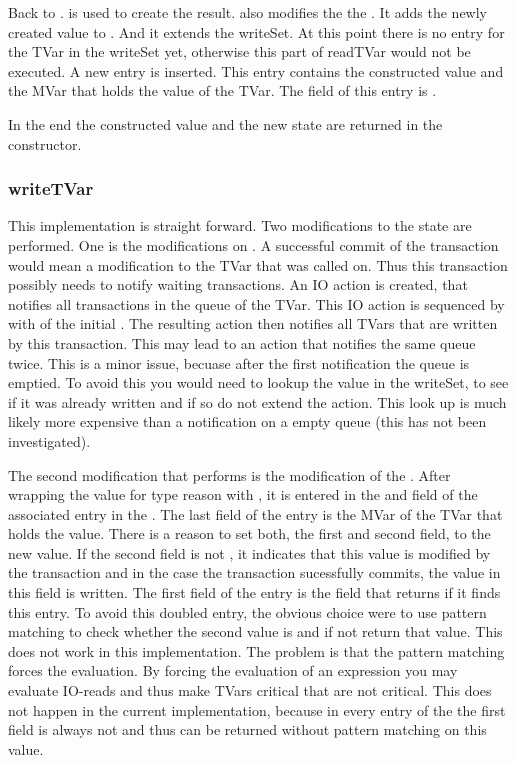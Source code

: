Back to .  is used to create the result.  also modifies the 
the . It adds the newly created value to . And it extends the writeSet.
At this point there is no entry for the TVar in the writeSet yet, otherwise this part of readTVar
would not be executed. A new entry is inserted. This entry contains the constructed value and 
the MVar that holds the value of the TVar. The  field of this entry is .

In the end the constructed value and the new state are returned in the  constructor.

\subsubsection{writeTVar}
This implementation is straight forward. Two modifications to the state are performed. One is
the modifications on . A successful commit of the transaction would mean a 
modification to the TVar that  was called on. Thus this transaction 
possibly needs to notify waiting transactions. An IO action is created, that notifies
all transactions in the queue of the TVar. This IO action is sequenced by \code{>>} with 
 of the initial . The resulting action then notifies all
TVars that are written by this transaction. This may lead to an action that notifies the 
same queue twice. This is a minor issue, becuase after the first notification the queue 
is emptied. To avoid this you would need to lookup the value in the writeSet, to see if 
it was already written and if so do not extend the  action. This look up
is much likely more expensive than a notification on a empty queue (this has not been 
investigated). 

The second modification that  performs is the modification of the .
After wrapping the value for type reason with , it is entered in the  and  
field of the associated entry in the . The last field of the entry is the MVar of
the TVar that holds the value. There is a reason to set both, the first and second field, to the
new value. If the second field is not , it indicates that this value is modified 
by the transaction and in the case the transaction sucessfully commits, the value in this field
is written. The first field of the entry is the field that  returns if it finds
this entry. To avoid this doubled entry, the obvious choice were to use pattern matching to 
check whether the second value is  and if not return that value. This does not
work in this implementation. The problem is that the pattern matching forces the evaluation.
By forcing the evaluation of an expression you may evaluate IO-reads and thus make TVars critical
that are not critical. This does not happen in the current implementation, because in every entry
of the  the first field is always not  and thus can be returned
without pattern matching on this value. 

